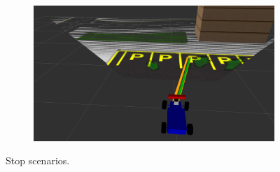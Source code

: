 \begin{figure}[h]
\begin{subfigure}[b]{0.45\linewidth}
  \end{subfigure}
  \begin{subfigure}[b]{0.45\linewidth}
    \includegraphics[width=\linewidth]{figures/experiments/parking-slot-pc.png}
  \end{subfigure}
  \caption[Stop scenarios]{Stop scenarios.}
  \label{figure:stop}
\end{figure}
